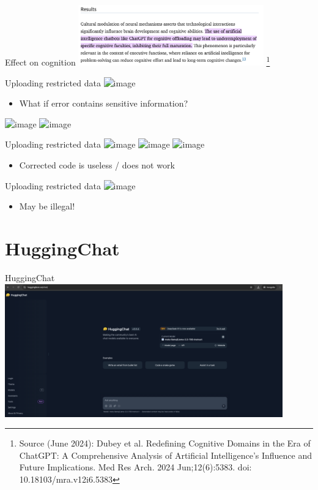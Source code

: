 \documentclass[t,xcolor={dvipsnames},final,aspectratio=169]{beamer}
\begin{document}
{
\begin{frame}{Effect on cognition}
\includegraphics[width=0.6\textwidth]{cognition.png}
\footnote{Source (June 2024): Dubey et al. Redefining Cognitive Domains in the Era of ChatGPT: A Comprehensive Analysis of Artificial Intelligence's Influence and Future Implications. Med Res Arch. 2024 Jun;12(6):5383. doi: 10.18103/mra.v12i6.5383}
\end{frame}
}

\begin{frame}{Uploading restricted data}
\includegraphics<+->[width=8cm]{llm.png}
\begin{itemize}
\item What if error contains sensitive information?
\end{itemize}
\includegraphics<+->[width=8cm]{municipalitiescode.png}
\includegraphics<+->[width=8cm]{municipalitieserror.png}
\end{frame}

\begin{frame}{Uploading restricted data}
\includegraphics<+->[width=8cm]{municipalitiescode.png}
\includegraphics<+->[width=8cm]{municipalitieserror.png}
\includegraphics<+->[width=8cm]{llm.png}
\begin{itemize}
\item Corrected code is useless / does not work
\end{itemize}
\end{frame}

\begin{frame}{Uploading restricted data}
\includegraphics<+->[width=8cm]{llmdata.png}
\begin{itemize}
\item May be illegal!
\end{itemize}
\end{frame}

\section{HuggingChat}

{
\begin{frame}{HuggingChat}
\includegraphics[width=0.9\textwidth]{huggingchat.png}
\end{frame}
}
\end{document}
